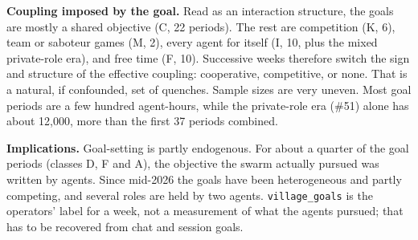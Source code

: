 \documentclass[reprint,aps,pre,10pt,superscriptaddress,nofootinbib]{revtex4-2}
\newcommand{\tbl}[1]{\texttt{\small #1}}
\begin{document}
\textbf{Coupling imposed by the goal.} Read as an interaction structure, the goals are mostly a shared objective (C, 22 periods). The rest are competition (K, 6), team or saboteur games (M, 2), every agent for itself (I, 10, plus the mixed private-role era), and free time (F, 10). Successive weeks therefore switch the sign and structure of the effective coupling: cooperative, competitive, or none. That is a natural, if confounded, set of quenches. Sample sizes are very uneven. Most goal periods are a few hundred agent-hours, while the private-role era (\#51) alone has about 12,000, more than the first 37 periods combined.

\textbf{Implications.} Goal-setting is partly endogenous. For about a quarter of the goal periods (classes D, F and A), the objective the swarm actually pursued was written by agents. Since mid-2026 the goals have been heterogeneous and partly competing, and several roles are held by two agents. \tbl{village\_goals} is the operators' label for a week, not a measurement of what the agents pursued; that has to be recovered from chat and session goals.
\end{document}
